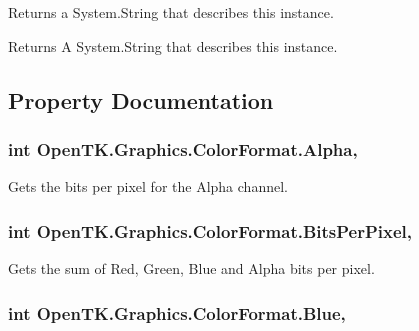 Returns a System.\-String that describes this instance. 

\begin{DoxyReturn}{Returns}
A System.\-String that describes this instance.
\end{DoxyReturn}


\subsection{Property Documentation}
\hypertarget{struct_open_t_k_1_1_graphics_1_1_color_format_a62139f7562786b8d8e4c1bc44d6f4ecc}{
\subsubsection[{Alpha}]{\setlength{\rightskip}{0pt plus 5cm}int Open\-T\-K.\-Graphics.\-Color\-Format.\-Alpha\hspace{0.3cm}{\ttfamily [get]}, {\ttfamily [set]}}}\label{struct_open_t_k_1_1_graphics_1_1_color_format_a62139f7562786b8d8e4c1bc44d6f4ecc}


Gets the bits per pixel for the Alpha channel.

\hypertarget{struct_open_t_k_1_1_graphics_1_1_color_format_a0e7b8a35d1e3504751ffcd000ec3e2ff}{
\subsubsection[{Bits\-Per\-Pixel}]{\setlength{\rightskip}{0pt plus 5cm}int Open\-T\-K.\-Graphics.\-Color\-Format.\-Bits\-Per\-Pixel\hspace{0.3cm}{\ttfamily [get]}, {\ttfamily [set]}}}\label{struct_open_t_k_1_1_graphics_1_1_color_format_a0e7b8a35d1e3504751ffcd000ec3e2ff}


Gets the sum of Red, Green, Blue and Alpha bits per pixel.

\hypertarget{struct_open_t_k_1_1_graphics_1_1_color_format_add160b210eeea02a6d3f476b87685fc5}{
\subsubsection[{Blue}]{\setlength{\rightskip}{0pt plus 5cm}int Open\-T\-K.\-Graphics.\-Color\-Format.\-Blue\hspace{0.3cm}{\ttfamily [get]}, {\ttfamily [set]}}}\label{struct_open_t_k_1_1_graphics_1_1_color_format_add160b210eeea02a6d3f476b87685fc5}



